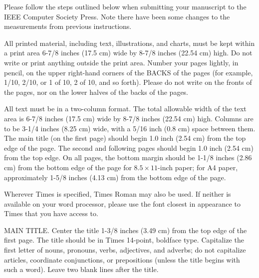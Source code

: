 \documentclass[times, 10pt,twocolumn]{article}
\begin{document}

Please follow the steps outlined below when submitting your manuscript to
the IEEE Computer Society Press. Note there have been some changes to the
measurements from previous instructions. 


All printed material, including text, illustrations, and charts, must be
kept within a print area 6-7/8 inches (17.5 cm) wide by 8-7/8 inches
(22.54 cm) high.  Do not write or print anything outside the print area.
Number your pages lightly, in pencil, on the upper right-hand corners of
the BACKS of the pages (for example, 1/10, 2/10, or 1 of 10, 2 of 10, and
so forth). Please do not write on the fronts of the pages, nor on the
lower halves of the backs of the pages.



All text must be in a two-column format. The total allowable width of the
text area is 6-7/8 inches (17.5 cm) wide by 8-7/8 inches (22.54 cm) high.
Columns are to be 3-1/4 inches (8.25 cm) wide, with a 5/16 inch (0.8 cm)
space between them.  The main title (on the first page) should begin 1.0
inch (2.54 cm) from the top edge of the page. The second and following
pages should begin 1.0 inch (2.54 cm) from the top edge. On all pages, the
bottom margin should be 1-1/8 inches (2.86 cm) from the bottom edge of the
page for $8.5 \times 11$-inch paper; for A4 paper, approximately 1-5/8
inches (4.13 cm) from the bottom edge of the page.


Wherever Times is specified, Times Roman may also be used.  If neither is
available on your word processor, please use the font closest in
appearance to Times that you have access to.

MAIN TITLE. Center the title 1-3/8 inches (3.49 cm) from the top edge of
the first page. The title should be in Times 14-point, boldface type.
Capitalize the first letter of nouns, pronouns, verbs, adjectives, and
adverbs; do not capitalize articles, coordinate conjunctions, or
prepositions (unless the title begins with such a word).  Leave two blank
lines after the title.
\end{document}
